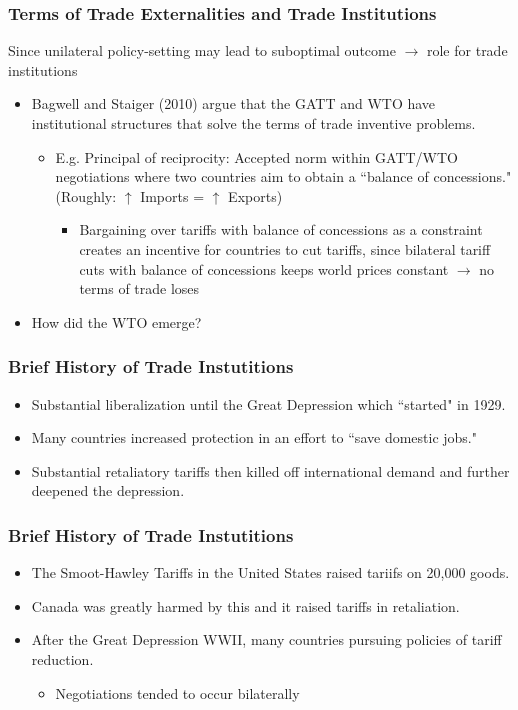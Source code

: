 \documentclass{beamer}
\begin{document}
\begin{frame}
	\frametitle{Terms of Trade Externalities and Trade Institutions}
Since unilateral policy-setting may lead to suboptimal outcome $\rightarrow$ role for trade institutions
	\begin{itemize}
		\item Bagwell and Staiger (2010) argue that the GATT and WTO have institutional structures that solve the terms of trade inventive problems.
			\begin{itemize}
				\item E.g. Principal of reciprocity: Accepted norm within GATT/WTO negotiations where two countries aim to obtain a ``balance of concessions." (Roughly: $\uparrow$ Imports = $\uparrow $ Exports)
					\begin{itemize}
						\item Bargaining over tariffs with balance of concessions as a constraint creates an incentive for countries to cut tariffs, since bilateral tariff cuts with balance of concessions keeps world prices constant $\rightarrow$ no terms of trade loses
					\end{itemize} 
			\end{itemize}
	\item How did the WTO emerge?
	\end{itemize}

\end{frame}

\begin{frame}
	\frametitle{Brief History of Trade Instutitions}
\begin{itemize}
	\item Substantial liberalization until the Great Depression which ``started" in 1929.
	\item Many countries increased protection in an effort to ``save domestic jobs."
	\item Substantial retaliatory tariffs then killed off international demand and further deepened the depression.
\end{itemize}

\end{frame}

\begin{frame}
	\frametitle{Brief History of Trade Instutitions}
\begin{itemize}
	\item The Smoot-Hawley Tariffs in the United States raised tariifs on 20,000 goods.
	\item  Canada was greatly harmed by this and it raised tariffs in retaliation.
	\item After the Great Depression WWII, many countries pursuing policies of tariff reduction.
		\begin{itemize}
			\item Negotiations tended to occur bilaterally 
		\end{itemize}
\end{itemize}
\end{frame}
\end{document}
